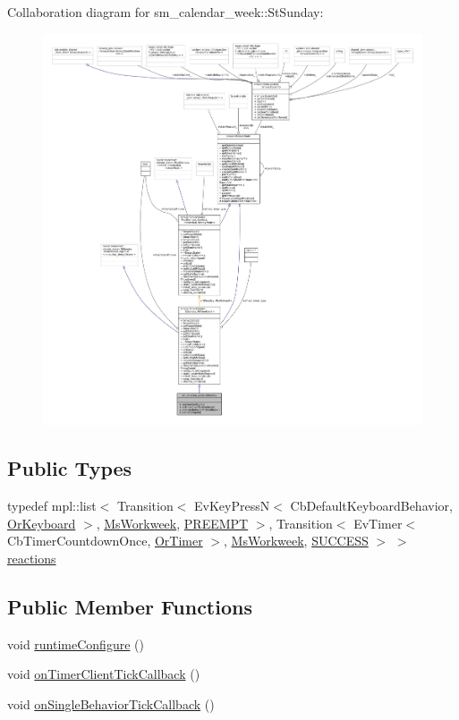 Collaboration diagram for sm\+\_\+calendar\+\_\+week\+:\+:St\+Sunday\+:
\nopagebreak
\begin{figure}[H]
\begin{center}
\leavevmode
\includegraphics[width=350pt]{structsm__calendar__week_1_1StSunday__coll__graph}
\end{center}
\end{figure}
\subsection*{Public Types}
\begin{DoxyCompactItemize}
\item 
typedef mpl\+::list$<$ Transition$<$ Ev\+Key\+PressN$<$ Cb\+Default\+Keyboard\+Behavior, \hyperlink{classsm__calendar__week_1_1OrKeyboard}{Or\+Keyboard} $>$, \hyperlink{classsm__calendar__week_1_1MsWorkweek}{Ms\+Workweek}, \hyperlink{classPREEMPT}{P\+R\+E\+E\+M\+PT} $>$, Transition$<$ Ev\+Timer$<$ Cb\+Timer\+Countdown\+Once, \hyperlink{classsm__calendar__week_1_1OrTimer}{Or\+Timer} $>$, \hyperlink{classsm__calendar__week_1_1MsWorkweek}{Ms\+Workweek}, \hyperlink{classSUCCESS}{S\+U\+C\+C\+E\+SS} $>$ $>$ \hyperlink{structsm__calendar__week_1_1StSunday_af2828352a507a4c972e43b318bb59a51}{reactions}
\end{DoxyCompactItemize}
\subsection*{Public Member Functions}
\begin{DoxyCompactItemize}
\item 
void \hyperlink{structsm__calendar__week_1_1StSunday_a28c840bf204044472162a7d3f14da28b}{runtime\+Configure} ()
\item 
void \hyperlink{structsm__calendar__week_1_1StSunday_a6bba2c59172fea49fc346a658b592557}{on\+Timer\+Client\+Tick\+Callback} ()
\item 
void \hyperlink{structsm__calendar__week_1_1StSunday_a5fd7a600527ff7246a90fffede448544}{on\+Single\+Behavior\+Tick\+Callback} ()
\end{DoxyCompactItemize}
